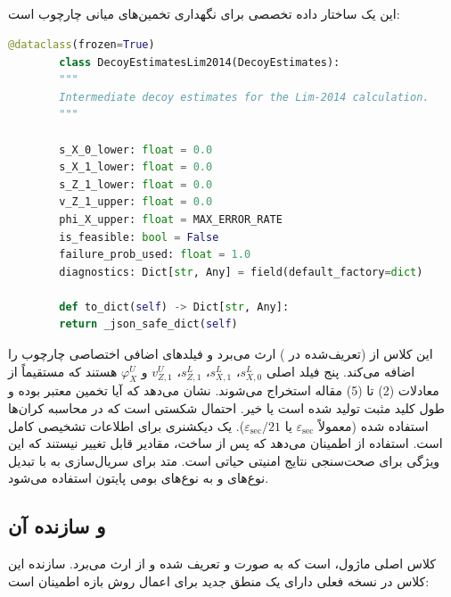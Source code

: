 \subsection{}

این  یک ساختار داده تخصصی برای نگهداری تخمین‌های میانی چارچوب  است:

\begin{LTR}
	\begin{lstlisting}[language=Python]
		@dataclass(frozen=True)
		class DecoyEstimatesLim2014(DecoyEstimates):
		"""
		Intermediate decoy estimates for the Lim-2014 calculation.
		"""
		
		s_X_0_lower: float = 0.0
		s_X_1_lower: float = 0.0
		s_Z_1_lower: float = 0.0
		v_Z_1_upper: float = 0.0
		phi_X_upper: float = MAX_ERROR_RATE
		is_feasible: bool = False
		failure_prob_used: float = 1.0
		diagnostics: Dict[str, Any] = field(default_factory=dict)
		
		def to_dict(self) -> Dict[str, Any]:
		return _json_safe_dict(self)
	\end{lstlisting}
\end{LTR}

این کلاس از  (تعریف‌شده در ) ارث می‌برد و فیلدهای اضافی اختصاصی چارچوب  را اضافه می‌کند. پنج فیلد اصلی $s_{X,0}^L$، $s_{X,1}^L$، $s_{Z,1}^L$، $v_{Z,1}^U$ و $\varphi_X^U$ هستند که مستقیماً از معادلات (2) تا (5) مقاله استخراج می‌شوند.  نشان می‌دهد که آیا تخمین معتبر بوده و طول کلید مثبت تولید شده است یا خیر.  احتمال شکستی است که در محاسبه کران‌ها استفاده شده (معمولاً $\varepsilon_{\text{sec}}$ یا $\varepsilon_{\text{sec}}/21$).  یک دیکشنری برای اطلاعات تشخیصی کامل است. استفاده از  اطمینان می‌دهد که پس از ساخت، مقادیر قابل تغییر نیستند که این ویژگی برای صحت‌سنجی نتایج امنیتی حیاتی است. متد  برای سریال‌سازی به  با تبدیل نوع‌های  و  به نوع‌های بومی پایتون استفاده می‌شود.

\subsection{ و سازنده آن}

کلاس اصلی ماژول،  است که به صورت  و  تعریف شده و از  ارث می‌برد. سازنده این کلاس در نسخه فعلی دارای یک منطق جدید برای اعمال روش بازه اطمینان است:


